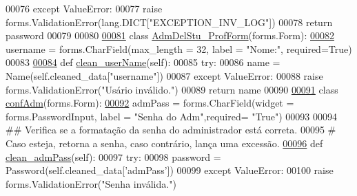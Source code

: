 \begin{DoxyCode}
00076         \textcolor{keywordflow}{except} ValueError:
00077             \textcolor{keywordflow}{raise} forms.ValidationError(lang.DICT[\textcolor{stringliteral}{"EXCEPTION\_INV\_LOG"}])
00078         \textcolor{keywordflow}{return} password
00079 
00080 
\hypertarget{Adm_2forms_8py_source_l00081}{}\hyperlink{classAdm_1_1forms_1_1AdmDelStu__ProfForm}{00081} \textcolor{keyword}{class }\hyperlink{classAdm_1_1forms_1_1AdmDelStu__ProfForm}{AdmDelStu\_ProfForm}(forms.Form): 
\hypertarget{Adm_2forms_8py_source_l00082}{}\hyperlink{classAdm_1_1forms_1_1AdmDelStu__ProfForm_a780eaf9b2d36cd160f6e574fe9023452}{00082}     username = forms.CharField(max\_length = 32, label = \textcolor{stringliteral}{"Nome:"}, required=\textcolor{keyword}{True})
00083     
\hypertarget{Adm_2forms_8py_source_l00084}{}\hyperlink{classAdm_1_1forms_1_1AdmDelStu__ProfForm_a94e95abce2216b75e0ddb9ddfdfef5c9}{00084}     \textcolor{keyword}{def }\hyperlink{classAdm_1_1forms_1_1AdmDelStu__ProfForm_a94e95abce2216b75e0ddb9ddfdfef5c9}{clean\_userName}(self):
00085         \textcolor{keywordflow}{try}:
00086             name = Name(self.cleaned\_data[\textcolor{stringliteral}{"username"}])
00087         \textcolor{keywordflow}{except} ValueError:
00088             \textcolor{keywordflow}{raise} forms.ValidationError(\textcolor{stringliteral}{"Usário inválido."})
00089         \textcolor{keywordflow}{return} name
00090         
\hypertarget{Adm_2forms_8py_source_l00091}{}\hyperlink{classAdm_1_1forms_1_1confAdm}{00091} \textcolor{keyword}{class }\hyperlink{classAdm_1_1forms_1_1confAdm}{confAdm}(forms.Form):
\hypertarget{Adm_2forms_8py_source_l00092}{}\hyperlink{classAdm_1_1forms_1_1confAdm_a30fc9256d1b7a6ca4ac453111c6944b9}{00092}     admPass = forms.CharField(widget = forms.PasswordInput, label = \textcolor{stringliteral}{"Senha do Adm"},required= \textcolor{stringliteral}{"True"})
00093 
00094     \textcolor{comment}{## Verifica se a formatação da senha do administrador está correta.}
00095     \textcolor{comment}{#   Caso esteja, retorna a senha, caso contrário, lança uma excessão.}
\hypertarget{Adm_2forms_8py_source_l00096}{}\hyperlink{classAdm_1_1forms_1_1confAdm_adb8ab8c61b8bc45b32c975d54f5b9ae0}{00096}     \textcolor{keyword}{def }\hyperlink{classAdm_1_1forms_1_1confAdm_adb8ab8c61b8bc45b32c975d54f5b9ae0}{clean\_admPass}(self):
00097         \textcolor{keywordflow}{try}:
00098             password = Password(self.cleaned\_data[\textcolor{stringliteral}{'admPass'}])
00099         \textcolor{keywordflow}{except} ValueError:
00100             \textcolor{keywordflow}{raise} forms.ValidationError(\textcolor{stringliteral}{"Senha inválida."})

\end{DoxyCode}
